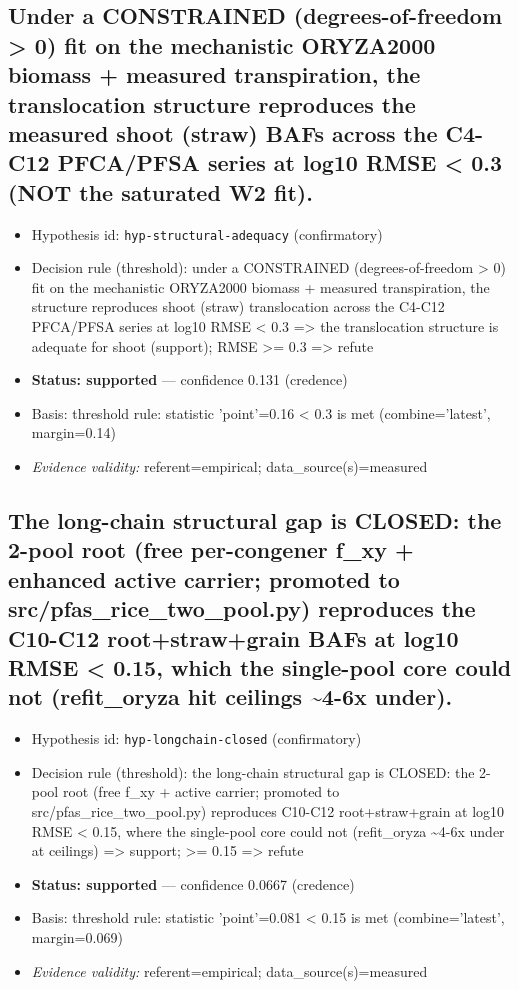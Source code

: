 \documentclass{article}
\begin{document}
\subsection{Under a CONSTRAINED (degrees-of-freedom > 0) fit on the mechanistic ORYZA2000 biomass + measured transpiration, the translocation structure reproduces the measured shoot (straw) BAFs across the C4-C12 PFCA/PFSA series at log10 RMSE < 0.3 (NOT the saturated W2 fit).}
\begin{itemize}
  \item Hypothesis id: \texttt{hyp-structural-adequacy} (confirmatory)
  \item Decision rule (threshold): under a CONSTRAINED (degrees-of-freedom > 0) fit on the mechanistic ORYZA2000 biomass + measured transpiration, the structure reproduces shoot (straw) translocation across the C4-C12 PFCA/PFSA series at log10 RMSE < 0.3 => the translocation structure is adequate for shoot (support); RMSE >= 0.3 => refute
  \item \textbf{Status: supported} --- confidence 0.131 (credence)
  \item Basis: threshold rule: statistic 'point'=0.16 < 0.3 is met (combine='latest', margin=0.14)
  \item \textit{Evidence validity:} referent=empirical; data\_source(s)=measured
\end{itemize}

\subsection{The long-chain structural gap is CLOSED: the 2-pool root (free per-congener f\_xy + enhanced active carrier; promoted to src/pfas\_rice\_two\_pool.py) reproduces the C10-C12 root+straw+grain BAFs at log10 RMSE < 0.15, which the single-pool core could not (refit\_oryza hit ceilings \textasciitilde{}4-6x under).}
\begin{itemize}
  \item Hypothesis id: \texttt{hyp-longchain-closed} (confirmatory)
  \item Decision rule (threshold): the long-chain structural gap is CLOSED: the 2-pool root (free f\_xy + active carrier; promoted to src/pfas\_rice\_two\_pool.py) reproduces C10-C12 root+straw+grain at log10 RMSE < 0.15, where the single-pool core could not (refit\_oryza \textasciitilde{}4-6x under at ceilings) => support; >= 0.15 => refute
  \item \textbf{Status: supported} --- confidence 0.0667 (credence)
  \item Basis: threshold rule: statistic 'point'=0.081 < 0.15 is met (combine='latest', margin=0.069)
  \item \textit{Evidence validity:} referent=empirical; data\_source(s)=measured
\end{itemize}
\end{document}
